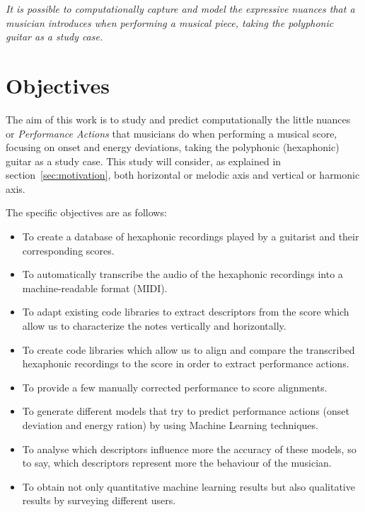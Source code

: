\textit{It is possible to computationally capture and model the expressive nuances that a musician introduces when performing a musical piece, taking the polyphonic guitar as a study case.}


\section{Objectives}
The aim of this work is to study and predict computationally the little nuances or \textit{Performance Actions} that musicians do when performing a musical score, focusing on onset and energy deviations, taking the polyphonic (hexaphonic) guitar as a study case. This study will consider, as explained in section~\ref{sec:motivation}, both horizontal or melodic axis and vertical or harmonic axis.

The specific objectives are as follows:

\begin{itemize}[noitemsep]
\item To create a database of hexaphonic recordings played by a guitarist and their corresponding scores.
\item To automatically transcribe the audio of the hexaphonic recordings into a machine-readable format (MIDI).
\item To adapt existing code libraries to extract descriptors from the score which allow us to characterize the notes vertically and horizontally.
\item To create code libraries which allow us to align and compare the transcribed hexaphonic recordings to the score in order to extract performance actions.
\item To provide a few manually corrected performance to score alignments.
\item To generate different models that try to predict performance actions (onset deviation and energy ration) by using Machine Learning techniques.
\item To analyse which descriptors influence more the accuracy of these models, so to say, which descriptors represent more the behaviour of the musician.
\item To obtain not only quantitative machine learning results but also qualitative results by surveying different users.
\end{itemize}

\cleardoublepage

